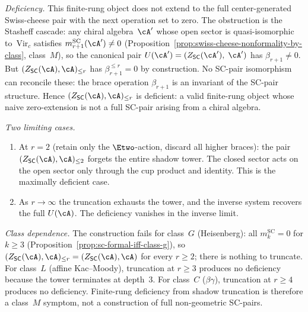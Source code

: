 \begin{example}
\smallskip
\noindent\emph{Deficiency.}
This finite-rung object does not extend to the full center-generated
Swiss-cheese pair with the next operation set to zero. The obstruction
is the Stasheff cascade: any chiral algebra~$\cA'$ whose open sector
is quasi-isomorphic
to~$\mathrm{Vir}_c$ satisfies $m_{r+1}^{\mathrm{SC}}(\cA') \neq 0$
(Proposition~\ref{prop:swiss-cheese-nonformality-by-class}, class~$M$),
so the canonical pair $U(\cA') = (Z_{\mathsf{SC}}(\cA'),\; \cA')$
has $\beta_{r+1} \neq 0$. But $(Z_{\mathsf{SC}}(\cA), \cA)_{\leq r}$
has $\beta_{r+1}^{\leq r} = 0$ by construction. No SC-pair
isomorphism can reconcile these: the brace operation
$\beta_{r+1}$ is an invariant of the SC-pair structure.
Hence $(Z_{\mathsf{SC}}(\cA), \cA)_{\leq r}$ is deficient:
a valid finite-rung object whose naive zero-extension is not a full
SC-pair arising from a chiral algebra.

\smallskip
\noindent\emph{Two limiting cases.}
\begin{enumerate}[label=\textup{(\roman*)},nosep]
\item At $r = 2$ (retain only the $\Etwo$-action, discard all higher
 braces): the pair
 $(Z_{\mathsf{SC}}(\cA), \cA)_{\leq 2}$ forgets the entire
 shadow tower. The closed sector acts on the open sector
 only through the cup product and identity.
 This is the maximally deficient case.
\item As $r \to \infty$ the truncation exhausts the tower,
 and the inverse system recovers the full $U(\cA)$. The deficiency
 vanishes in the inverse limit.
\end{enumerate}

\smallskip
\noindent\emph{Class dependence.}
The construction fails for class~$G$ (Heisenberg): all
$m_k^{\mathrm{SC}} = 0$ for $k \geq 3$
(Proposition~\ref{prop:sc-formal-iff-class-g}), so
$(Z_{\mathsf{SC}}(\cA), \cA)_{\leq r}
= (Z_{\mathsf{SC}}(\cA), \cA)$ for every $r \geq 2$; there is
nothing to truncate. For class~$L$ (affine Kac--Moody),
truncation at $r \geq 3$ produces no deficiency because the tower
terminates at depth~$3$. For class~$C$ ($\beta\gamma$),
truncation at $r \geq 4$ produces no deficiency. Finite-rung
deficiency from shadow truncation is therefore a class~$M$ symptom,
not a construction of full non-geometric SC-pairs.
\end{example}





